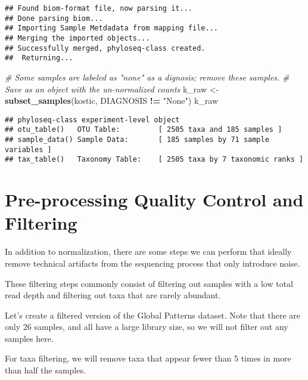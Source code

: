\documentclass[
]{book}
\newenvironment{Shaded}{\begin{snugshade}}{\end{snugshade}}
\newcommand{\CommentTok}[1]{\textcolor[rgb]{0.56,0.35,0.01}{\textit{#1}}}
\newcommand{\KeywordTok}[1]{\textcolor[rgb]{0.13,0.29,0.53}{\textbf{#1}}}
\newcommand{\NormalTok}[1]{#1}
\newcommand{\OperatorTok}[1]{\textcolor[rgb]{0.81,0.36,0.00}{\textbf{#1}}}
\newcommand{\StringTok}[1]{\textcolor[rgb]{0.31,0.60,0.02}{#1}}
\begin{document}
\begin{verbatim}
## Found biom-format file, now parsing it... 
## Done parsing biom... 
## Importing Sample Metdadata from mapping file...
## Merging the imported objects... 
## Successfully merged, phyloseq-class created. 
##  Returning...
\end{verbatim}

\begin{Shaded}
\begin{Highlighting}[]
\CommentTok{\# Some samples are labeled as "none" as a dignosis; remove these samples. }
\CommentTok{\# Save as an object with the un{-}normalized counts}
\NormalTok{k\_raw \textless{}{-}}\StringTok{ }\KeywordTok{subset\_samples}\NormalTok{(kostic, DIAGNOSIS }\OperatorTok{!=}\StringTok{ "None"}\NormalTok{)}
\NormalTok{k\_raw}
\end{Highlighting}
\end{Shaded}

\begin{verbatim}
## phyloseq-class experiment-level object
## otu_table()   OTU Table:         [ 2505 taxa and 185 samples ]
## sample_data() Sample Data:       [ 185 samples by 71 sample variables ]
## tax_table()   Taxonomy Table:    [ 2505 taxa by 7 taxonomic ranks ]
\end{verbatim}

\hypertarget{pre-processing-quality-control-and-filtering}{%
\section{Pre-processing Quality Control and Filtering}\label{pre-processing-quality-control-and-filtering}}

In addition to normalization, there are some steps we can perform that ideally remove technical artifacts from the sequencing process that only introduce noise.

These filtering steps commonly consist of filtering out samples with a low total read depth and filtering out taxa that are rarely abundant.

Let's create a filtered version of the Global Patterns dataset. Note that there are only 26 samples, and all have a large library size, so we will not filter out any samples here.

For taxa filtering, we will remove taxa that appear fewer than 5 times in more than half the samples.
\end{document}
